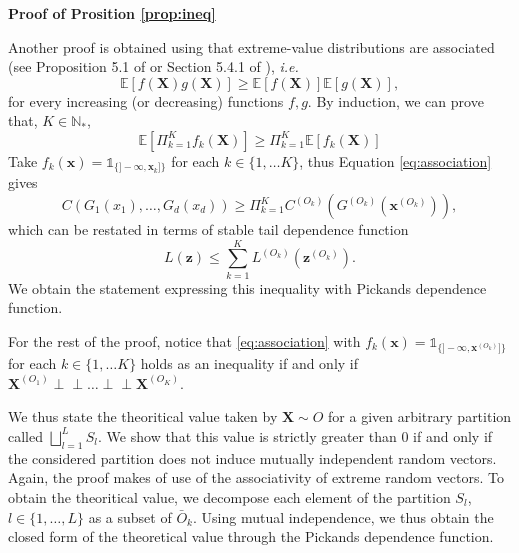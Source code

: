 \documentclass[11pt]{article}
\makeatletter
\renewenvironment{proof}[1][\proofname]{\par
\pushQED{\qed}%
\normalfont \topsep6\p@\@plus6\p@\relax
\trivlist
\item\relax
{\textbf{
#1\@addpunct{ }}}\hspace\labelsep\ignorespaces
}{%
\popQED\endtrivlist\@endpefalse
}
\newcommand{\indep}{\perp \!\!\! \perp}
\makeatother
\begin{document}
\begin{proof}[Proof of Prosition \ref{prop:ineq}]
	Another proof is obtained using that extreme-value distributions are associated (see Proposition 5.1 of \cite{marshall1983} or Section 5.4.1 of \cite{resnick2008extreme}), \emph{i.e.}
	\begin{equation*}
		\mathbb{E}\left[f(\textbf{X}) g(\textbf{X}) \right] \geq \mathbb{E}\left[ f(\textbf{X})\right] \mathbb{E} \left[g(\textbf{X}) \right],
	\end{equation*}
	for every increasing (or decreasing) functions $f,g$. By induction, we can prove that, $K \in \mathbb{N}_*$, 
	\begin{equation}
		\label{eq:association}
		\mathbb{E}\left[\Pi_{k=1}^K f_k(\textbf{X}) \right] \geq \Pi_{k=1}^K \mathbb{E}\left[ f_k(\textbf{X}) \right]
	\end{equation}	
	Take $f_k(\textbf{x}) = \mathds{1}_{\{]-\infty, \textbf{x}_k]\}}$ for each $k \in \{1, \dots K\}$, thus Equation \eqref{eq:association} gives
	\begin{equation*}
		C(G_1(x_1), \dots, G_d(x_d)) \geq \Pi_{k=1}^K C^{(O_k)} \left(G^{(O_k)}\left(\textbf{x}^{(O_k)}\right) \right),
	\end{equation*}
	which can be restated in terms of stable tail dependence function
	\begin{equation*}
		L(\textbf{z}) \leq \sum_{k=1}^K L^{(O_k)}(\textbf{z}^{(O_k)}).
	\end{equation*}
	We obtain the statement expressing this inequality with Pickands dependence function.
	
	For the rest of the proof, notice that \eqref{eq:association} with $f_k(\textbf{x}) = \mathds{1}_{\{]-\infty, \textbf{x}^{(O_k)}]\}}$ for each $k \in \{1, \dots K\}$ holds as an inequality if and only if $\textbf{X}^{(O_1)} \indep \dots \indep \textbf{X}^{(O_K)}$.
	\end{proof}
	
	We thus state the theoritical value taken by $\textbf{X} \sim O$ for a given arbitrary partition called $\bigsqcup_{l=1}^L S_l$. We show that this value is strictly greater than $0$ if and only if the considered partition does not induce mutually independent random vectors. Again, the proof makes of use of the associativity of extreme random vectors. To obtain the theoritical value, we decompose each element of the partition $S_l$, $l \in \{1,\dots,L\}$ as a subset of $\bar{O}_k$. Using mutual independence, we thus obtain the closed form of the theoretical value through the Pickands dependence function.
	
\end{document}
